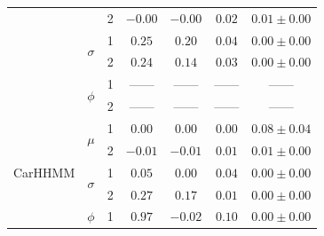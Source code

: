 \documentclass[12pt]{TD-CJS}
\begin{document}
\begin{table}
{\begin{tabular}{ccccccc}
                           &                               & 2                             & $-0.00$                         & $-0.00$                     & $0.02$                             & $0.01 \pm 0.00$                             \\
                           & \multirow{2}{*}{$\sigma$}     & 1                             & $0.25$                         & $0.20$                     & $0.04$                             & $0.00 \pm 0.00$                             \\
                           &                               & 2                             & $0.24$                         & $0.14$                     & $0.03$                             & $0.00 \pm 0.00$                             \\ 
                           & \multirow{2}{*}{$\phi$}       & 1                             & ------                         & ------                     & ------                             & ------                                      \\
                           &                               & 2                             & ------                         & ------                     & ------                             & ------                                      \\ \hline
\multirow{6}{*}{CarHHMM}   & \multirow{2}{*}{$\mu$}        & 1                             & $0.00$                         & $0.00$                     & $0.00$                             & $0.08 \pm 0.04$                             \\
                           &                               & 2                             & $-0.01$                         & $-0.01$                     & $0.01$                             & $0.01 \pm 0.00$                             \\
                           & \multirow{2}{*}{$\sigma$}     & 1                             & $0.05$                         & $0.00$                     & $0.04$                             & $0.00 \pm 0.00$                             \\
                           &                               & 2                             & $0.27$                         & $0.17$                     & $0.01$                             & $0.00 \pm 0.00$                             \\ 
                           & \multirow{2}{*}{$\phi$}       & 1                             & $0.97$                         & $-0.02$                     & $0.10$                             & $0.00 \pm 0.00$                             \\

\end{tabular}}
\end{table}
\end{document}
